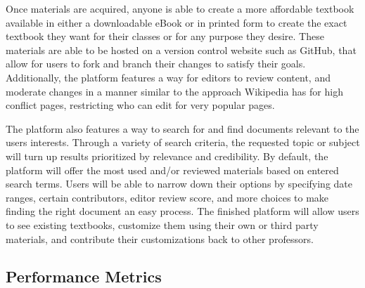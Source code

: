 \documentclass[letterpaper, 10pt, draftclsnofoot, onecolumn, compsoc]{IEEEtran}
\begin{document}
\medskip

{\noindent Once materials are acquired, anyone is able to create a more 
affordable textbook available in either a downloadable eBook or in 
printed form to create the exact textbook they want for their classes or 
for any purpose they desire. 
These materials are able to be hosted on a version control website such 
as GitHub, that allow for users to fork and branch their changes to 
satisfy their goals.
Additionally, the platform features a way for editors to review 
content, and moderate changes in a manner similar to the approach 
Wikipedia has for high conflict pages, restricting who can edit for very 
popular pages. \par}

\medskip

{\noindent The platform also features a way to search for and find 
documents relevant to the users interests. 
Through a variety of search criteria, the requested topic or subject will
turn up results prioritized by relevance and credibility. By default, the 
platform will offer the most used and/or reviewed materials
based on entered search terms. Users will be able to narrow down their 
options by specifying date ranges, certain contributors, editor review 
score, and more choices to make finding the right document an easy 
process. 
The finished platform will allow users to see existing 
textbooks, customize them using their own or third party materials, and 
contribute their customizations back to other professors. \par}

\subsection{Performance Metrics}
\vspace{1pc}
\end{document}
